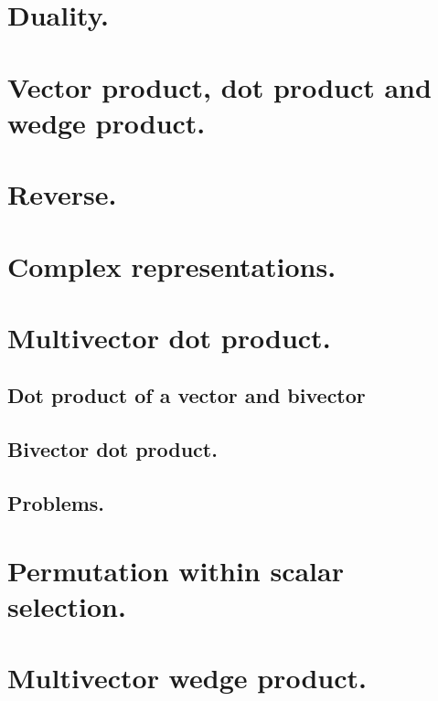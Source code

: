    \section{Duality.}
     
   \section{Vector product, dot product and wedge product.}
      
   \section{Reverse.}
      
   \section{Complex representations.}
      
   \section{Multivector dot product.}
      
      \subsection{Dot product of a vector and bivector}
         
      \subsection{Bivector dot product.}
         
      \subsection{Problems.}
         
   \section{Permutation within scalar selection.}
      
   \section{Multivector wedge product.}
      
